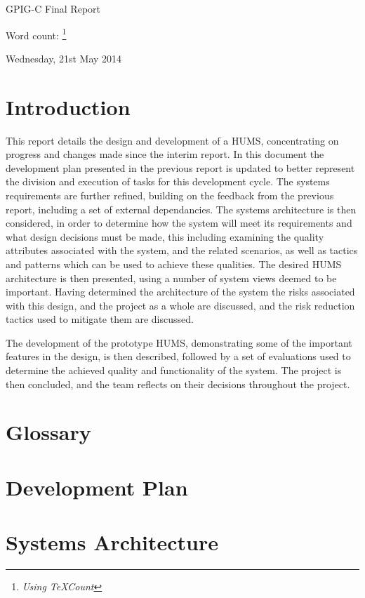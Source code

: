 \documentclass[10pt,a4paper]{article}
\begin{document}
\begin{center}
{\Large GPIG-C Final Report}

Word count: \unskip
\footnote{\textit{Using TeXCount}}

Wednesday, 21st May 2014
\end{center}

\section{Introduction}
\label{sec:intro}
This report details the design and development of a HUMS, concentrating on progress and changes made since the interim report. In this document the development plan presented in the previous report is updated to better represent the division and execution of tasks for this development cycle. The systems requirements are further refined, building on the feedback from the previous report, including a set of external dependancies. The systems architecture is then considered, in order to determine how the system will meet its requirements and what design decisions must be made, this including examining the quality attributes associated with the system, and the related scenarios, as well as tactics and patterns which can be used to achieve these qualities. The desired HUMS architecture is then presented, using a number of system views deemed to be important. Having determined the architecture of the system the risks associated with this design, and the project as a whole are discussed, and the risk reduction tactics used to mitigate them are discussed.

The development of the prototype HUMS, demonstrating some of the important features in the design, is then described, followed by a set of evaluations used to determine the achieved quality and functionality of the system. The project is then concluded, and the team reflects on their decisions throughout the project.
\section{Glossary}
\label{sec:glossary}

\section{Development Plan}
\label{sec:dev_plan}


\section{Systems Architecture}
\label{sec:systems_architecture}
\end{document}
